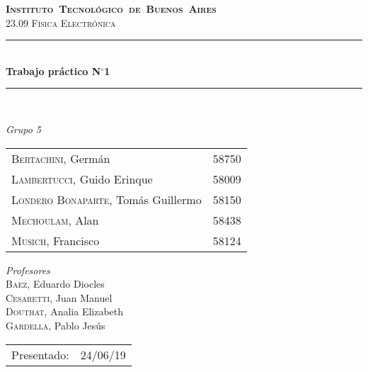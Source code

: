 \begin{titlepage}
\newcommand{\HRule}{\rule{\linewidth}{0.5mm}}
\center
\mbox{\textsc{\LARGE \bfseries {Instituto Tecnológico de Buenos Aires}}}\\[1.5cm]
\textsc{\Large 23.09 Física Electrónica}\\[0.5cm]

\HRule \\[0.6cm]
{ \Huge \bfseries Trabajo práctico N$^{\circ}$1}\\[0.4cm] 
\HRule \\[1.5cm]


{\large

\emph{Grupo 5}\\
\vspace{3px}

\begin{tabular}{lr}
\textsc{Bertachini}, Germán  & 58750 \\ 	
\textsc{Lambertucci}, Guido Erinque  & 58009 \\
\textsc{Londero Bonaparte}, Tomás Guillermo  & 58150 \\
\textsc{Mechoulam}, Alan  &  58438\\
\textsc{Musich}, Francisco  & 58124 \\

\end{tabular}

\vspace{20px}

\emph{Profesores}\\
\vspace{3px}
\textsc{Baez}, Eduardo Diocles\\ 	
\textsc{Cesaretti}, Juan Manuel\\ 
\textsc{Douthat}, Analia Elizabeth\\ 
\textsc{Gardella}, Pablo Jesús\\ 	

\vspace{100px}

\begin{tabular}{ll}

Presentado: & 24/06/19\\

\end{tabular}

}

\vfill

\end{titlepage}
